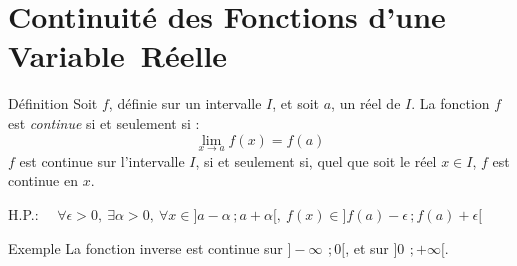 \documentclass{coursbook}
\begin{document}
    \chapter{Continuité des Fonctions d'une Variable~Réelle}
    \begin{Gpartie}{Définition}
        Soit $f$, définie sur un intervalle $I$, et soit $a$, un réel de $I$.
        La fonction $f$ est \emph{continue} si et seulement si : \[\boxed{\lim_{x \to a} f(x)=f(a)}\]
        $f$ est continue sur l'intervalle $I$, si et seulement si, quel que soit le réel $x\in I$, $f$ est continue en $x$.

        H.P.: $\quad\forall\epsilon >0,~\exists\alpha >0,~\forall x\in\big]a-\alpha\,;a+\alpha\big[,~f(x)\in\big]f(a)-\epsilon\,;f(a)+\epsilon\big[$
        \begin{Spartie}{Exemple}
            La fonction inverse est continue sur $\big]-\infty\,~;0\big[$, et sur $\big]0\,~;+\infty\big[$.


\end{Spartie}
\end{Gpartie}
\end{document}
